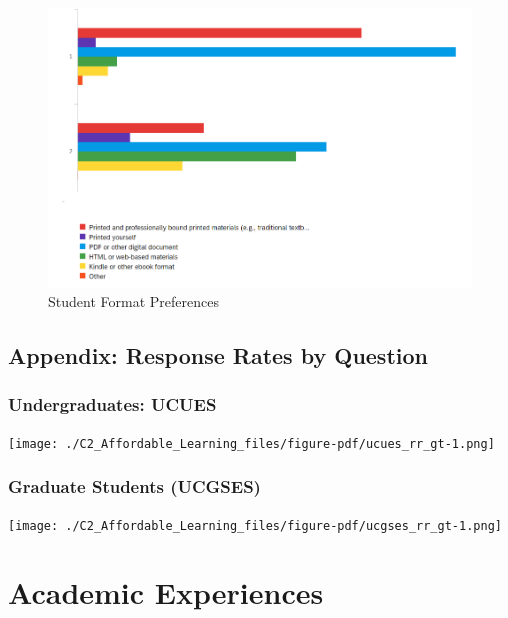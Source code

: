 \documentclass[
  letterpaper,
  DIV=11,
  numbers=noendperiod]{scrreprt}
\begin{document}
\begin{figure}

{\centering \includegraphics{./viz/alfs/AOCM_format_pref.png}

}

\caption{Student Format Preferences}

\end{figure}

\hypertarget{appendix-response-rates-by-question}{%
\section{Appendix: Response Rates by
Question}\label{appendix-response-rates-by-question}}

\hypertarget{undergraduates-ucues}{%
\subsection{Undergraduates: UCUES}\label{undergraduates-ucues}}

\texttt{[image: ./C2\_Affordable\_Learning\_files/figure-pdf/ucues\_rr\_gt-1.png]}

\hypertarget{graduate-students-ucgses}{%
\subsection{Graduate Students (UCGSES)}\label{graduate-students-ucgses}}

\texttt{[image: ./C2\_Affordable\_Learning\_files/figure-pdf/ucgses\_rr\_gt-1.png]}


\hypertarget{academic-experiences}{%
\chapter{Academic Experiences}\label{academic-experiences}}
\end{document}
